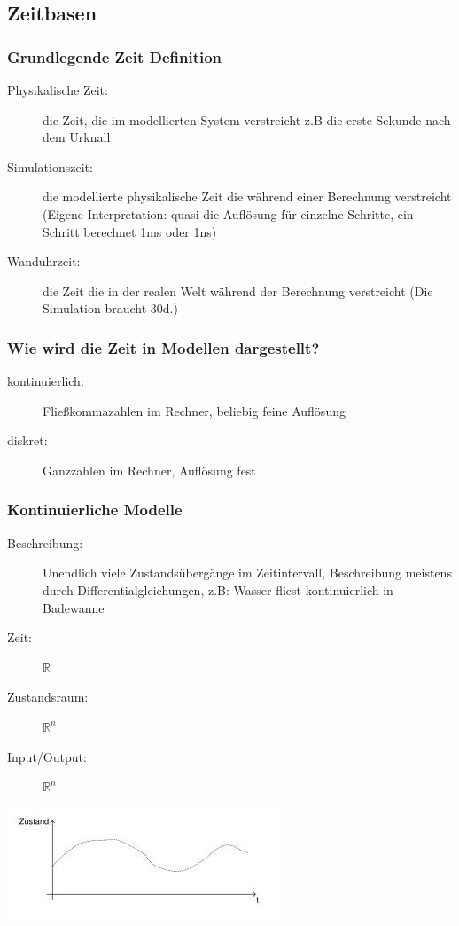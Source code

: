 \documentclass[11pt, fleqn, a4paper, leqno]{scrartcl} %
\begin{document}
	\subsection{Zeitbasen}
		\subsubsection{Grundlegende Zeit Definition}
			\begin{description}
				\item[Physikalische Zeit:] die Zeit, die im modellierten System verstreicht z.B die erste Sekunde nach dem Urknall
				\item[Simulationszeit:] die modellierte physikalische Zeit die während einer Berechnung verstreicht (Eigene Interpretation: quasi die Auflösung für einzelne Schritte, ein Schritt berechnet 1ms oder 1ns)
				\item[Wanduhrzeit:] die Zeit die in der realen Welt während der Berechnung verstreicht (Die Simulation braucht 30d.)
			\end{description}
		\subsubsection{Wie wird die Zeit in Modellen dargestellt?}
			\begin{description}
				\item[kontinuierlich:] Fließkommazahlen im Rechner, beliebig feine Auflösung
				\item[diskret:] Ganzzahlen im Rechner, Auflösung fest
			\end{description}
		\subsubsection{Kontinuierliche Modelle}
			\begin{description}
				\item[Beschreibung:] Unendlich viele Zustandsübergänge im Zeitintervall, Beschreibung meistens durch Differentialgleichungen, z.B: Wasser fliest kontinuierlich in Badewanne
				\item[Zeit:] $\mathds{R}$
				\item[Zustandsraum:] $\mathds{R}^{n}$
				\item[Input/Output:] $\mathds{R}^{n}$
			\end{description}
			\begin{center}
				\includegraphics [scale=0.6]{images/kontinuierliche-modelle.jpg}
			\end{center}
\end{document}
